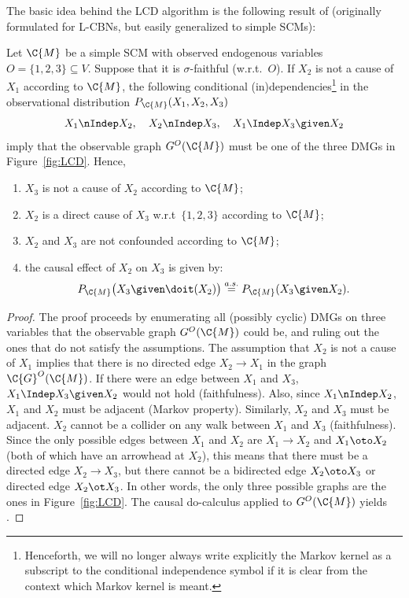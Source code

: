 The basic idea behind the LCD algorithm is the following result of \cite{Cooper1997}
(originally formulated for L-CBNs, but easily generalized to simple SCMs):
\begin{Prp}\label{prp:LCD}
  Let $\C{M}$ be a simple SCM with observed endogenous variables $O = \{1,2,3\} \subseteq V$.
  Suppose that it is $\sigma$-faithful (w.r.t.\ $O$). 
  If $X_2$ is not a cause of $X_1$ according to $\C{M}$,
  the following conditional (in)dependencies\footnote{Henceforth, we will no longer always write
  explicitly the Markov kernel as a subscript to the conditional independence symbol if it is clear
  from the context which Markov kernel is meant.} in the observational distribution $P_{\C{M}}(X_1,X_2,X_3)$
  $$X_1 \nIndep X_2, \quad X_2 \nIndep X_3, \quad X_1 \Indep X_3 \given X_2$$
  imply that the observable graph $G^O(\C{M})$ must be one of the three DMGs in Figure~\ref{fig:LCD}. 
  Hence,
  \begin{enumerate}
  \item $X_3$ is not a cause of $X_2$ according to $\C{M}$;
  \item $X_2$ is a direct cause of $X_3$ w.r.t\ $\{1,2,3\}$ according to $\C{M}$;
  \item $X_2$ and $X_3$ are not confounded according to $\C{M}$;
  \item the causal effect of $X_2$ on $X_3$ is given by:
    \begin{equation}\label{eq:LCD}
      P_{\C{M}}\big(X_3 \given \doit(X_2)\big) \stackrel{a.s.}{=} P_{\C{M}}(X_3 \given X_2).
    \end{equation}
  \end{enumerate}
\end{Prp}
\begin{proof}
The proof proceeds by enumerating all (possibly cyclic) DMGs on three variables that the observable graph
$G^O(\C{M})$ could be, and ruling out the ones that do not satisfy the assumptions.
The assumption that $X_2$ is not a cause of $X_1$ implies that there is no directed edge
$X_2 \to X_1$ in the graph $\C{G}^O(\C{M})$. If there were an edge between $X_1$ and $X_3$,
$X_1 \Indep X_3 \given X_2$ would not hold (faithfulness). Also, since $X_1 \nIndep X_2$, $X_1$ and
$X_2$ must be adjacent (Markov property). Similarly, $X_2$ and $X_3$ must be adjacent. $X_2$ cannot be
a collider on any walk between $X_1$ and $X_3$ (faithfulness). Since the only possible edges between
$X_1$ and $X_2$ are $X_1 \to X_2$ and $X_1 \oto X_2$ (both of which have an arrowhead at $X_2$), 
this means that there must be a
directed edge $X_2 \to X_3$, but there cannot be a  bidirected edge $X_2 \oto X_3$ or directed edge $X_2 \ot X_3$. 
In other words, the only three possible graphs are the ones in Figure~\ref{fig:LCD}.
The causal do-calculus applied to $G^O(\C{M})$ yields .
\end{proof}

